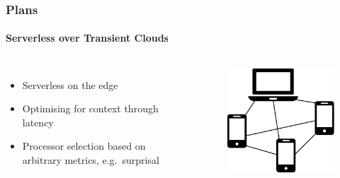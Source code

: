 \documentclass[aspectratio=169]{beamer}
\begin{document}
\begin{frame}
	\frametitle{Plans}
	\framesubtitle{Serverless over Transient Clouds}

	\begin{columns}[c]
		\begin{itemize}
			\item Serverless on the edge
			\item Optimising for context through latency
			\item Processor selection based on arbitrary metrics, e.g.\ surprisal
		\end{itemize}
		\begin{figure}
			\centering
			\includegraphics[width=0.8\columnwidth]{tcac}
		\end{figure}
	\end{columns}
\end{frame}
\end{document}

